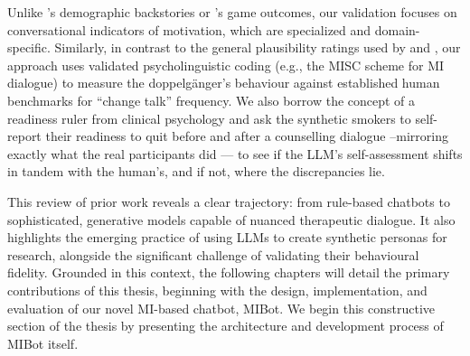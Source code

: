 Unlike \citet{argyle2023}'s demographic backstories or \citet{aher2023}'s game outcomes, our validation focuses on conversational indicators of motivation, which are specialized and domain-specific. Similarly, in contrast to the general plausibility ratings used by \citet{Cook2025} and \citet{Haider2025}, our approach uses validated psycholinguistic coding (e.g., the MISC scheme for MI dialogue) to measure the doppelgänger's behaviour against established human benchmarks for ``change talk'' frequency. We also borrow the concept of a readiness ruler from clinical psychology and ask the synthetic smokers to self-report their readiness to quit before and after a counselling dialogue --mirroring exactly what the real participants did --- to see if the LLM's self-assessment shifts in tandem with the human's, and if not, where the discrepancies lie.

This review of prior work reveals a clear trajectory: from rule-based chatbots to sophisticated, generative models capable of nuanced therapeutic dialogue. It also highlights the emerging practice of using LLMs to create synthetic personas for research, alongside the significant challenge of validating their behavioural fidelity. Grounded in this context, the following chapters will detail the primary contributions of this thesis, beginning with the design, implementation, and evaluation of our novel MI-based chatbot, MIBot. We begin this constructive section of the thesis by presenting the architecture and development process of MIBot itself.
